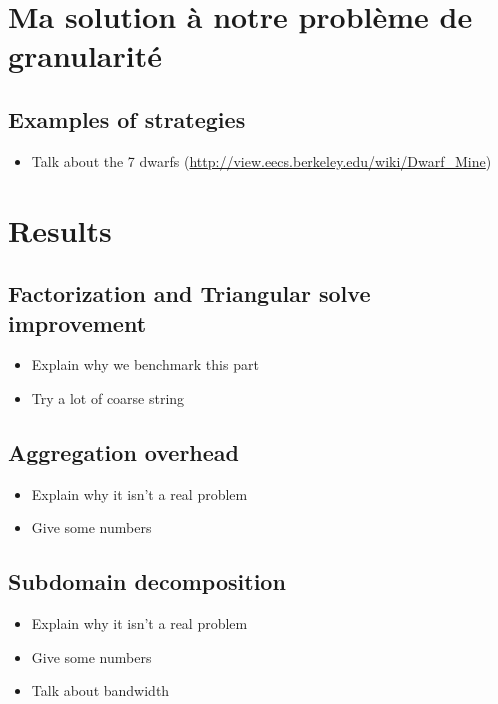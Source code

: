 \documentclass[oneside,12t]{classes/Thesis}
\begin{document}
\section{Ma solution à notre problème de granularité}






\subsection{Examples of strategies}
  \begin{itemize}
    \item Talk about the 7 dwarfs (\url{http://view.eecs.berkeley.edu/wiki/Dwarf_Mine})
  \end{itemize}




\section{Results}
\subsection{Factorization and Triangular solve improvement}
  \begin{itemize}
    \item Explain why we benchmark this part
    \item Try a lot of coarse string
  \end{itemize}
\subsection{Aggregation overhead}
  \begin{itemize}
    \item Explain why it isn't a real problem
    \item Give some numbers
  \end{itemize}
\subsection{Subdomain decomposition}
  \begin{itemize}
    \item Explain why it isn't a real problem
    \item Give some numbers
    \item Talk about bandwidth
  \end{itemize}
\end{document}
